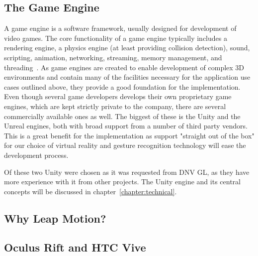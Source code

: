 \subsection{The Game Engine}
A game engine is a software framework, usually designed for development of video games. 
The core functionality of a game engine typically includes a rendering engine, a physics engine (at least providing collision detection), sound, scripting, 
animation, networking, streaming, memory management, and threading~\citep{Gregory2014}. As game engines are created to enable development of complex 
3D environments and contain many of the facilities necessary for the application use cases outlined above, they provide a good foundation for the implementation.
Even though several game developers develops their own proprietary game engines, which are kept strictly private to the company, there are several commercially available ones 
as well. The biggest of these is the Unity and the Unreal engines, both with broad support from a number of third party vendors. This is a great benefit for the implementation 
as support "straight out of the box" for our choice of virtual reality and gesture recognition technology will ease the development process.

Of these two Unity were chosen as it was requested from DNV GL, as they have more experience with it from other projects.
The Unity engine and its central concepts will be discussed in chapter~\vref{chapter:technical}.


\subsection{Why Leap Motion?}


\subsection{Oculus Rift and HTC Vive}



